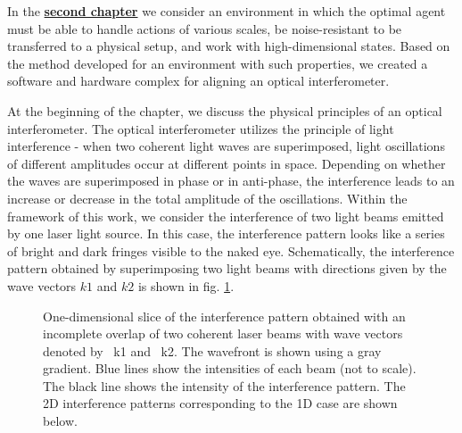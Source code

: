 In the \underline{\textbf{second chapter}} we consider an environment in which the optimal agent must be able to handle actions of various scales, be noise-resistant to be transferred to a physical setup, and work with high-dimensional states. Based on the method developed for an environment with such properties, we created a software and hardware complex for aligning an optical interferometer.

At the beginning of the chapter, we discuss the physical principles of an optical interferometer. The optical interferometer utilizes the principle of light interference - when two coherent light waves are superimposed, light oscillations of different amplitudes occur at different points in space. Depending on whether the waves are superimposed in phase or in anti-phase, the interference leads to an increase or decrease in the total amplitude of the oscillations. Within the framework of this work, we consider the interference of two light beams emitted by one laser light source. In this case, the interference pattern looks like a series of bright and dark fringes visible to the naked eye. Schematically, the interference pattern obtained by superimposing two light beams with directions given by the wave vectors $k1$ and $k2$ is shown in fig. \ref{fig:two_beam_interf}.

\begin{figure}[ht]
    \caption{
    One-dimensional slice of the interference pattern obtained with an incomplete overlap of two coherent laser beams with wave vectors denoted by ~k1 and ~k2. The wavefront is shown using a gray gradient. Blue lines show the intensities of each beam (not to scale). The black line shows the intensity of the interference pattern. The 2D interference patterns corresponding to the 1D case are shown below.}
\label{fig:two_beam_interf}
\end{figure}


